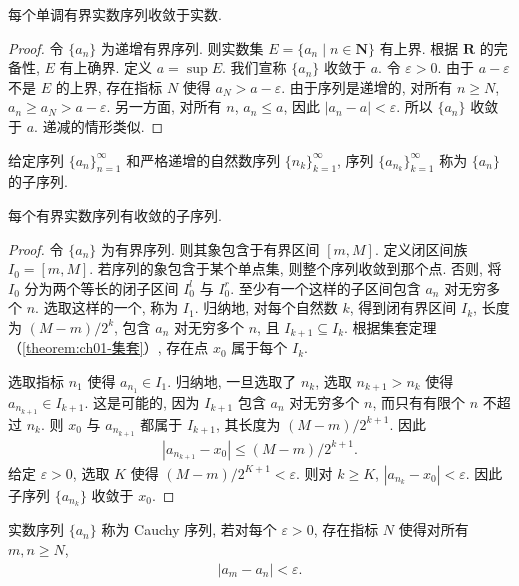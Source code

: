 \documentclass[../../main.tex]{subfiles}
\begin{document}
\begin{theorem}[单调收敛准则]\label{theorem:ch01-单调收敛}
每个单调有界实数序列收敛于实数.
\end{theorem}

\begin{proof}
令 $\{a_{n}\}$ 为递增有界序列. 则实数集 $E=\{a_{n}\mid n\in\mathbf{N}\}$ 有上界. 根据 $\mathbf{R}$ 的完备性, $E$ 有上确界. 定义 $a=\sup E$. 我们宣称 $\{a_{n}\}$ 收敛于 $a$. 令 $\varepsilon>0$. 由于 $a-\varepsilon$ 不是 $E$ 的上界, 存在指标 $N$ 使得 $a_{N}>a-\varepsilon$. 由于序列是递增的, 对所有 $n\geqslant N$, $a_{n}\geqslant a_{N}>a-\varepsilon$. 另一方面, 对所有 $n$, $a_{n}\leqslant a$, 因此 $|a_{n}-a|<\varepsilon$. 所以 $\{a_{n}\}$ 收敛于 $a$. 递减的情形类似.
\end{proof}

给定序列 $\{a_{n}\}_{n=1}^{\infty}$ 和严格递增的自然数序列 $\{n_{k}\}_{k=1}^{\infty}$, 序列 $\{a_{n_{k}}\}_{k=1}^{\infty}$ 称为 $\{a_{n}\}$ 的子序列.

\begin{theorem}\label{theorem:ch01-BW}
每个有界实数序列有收敛的子序列.
\end{theorem}

\begin{proof}
令 $\{a_{n}\}$ 为有界序列. 则其象包含于有界区间 $[m,M]$. 定义闭区间族 $I_{0}=[m,M]$. 若序列的象包含于某个单点集, 则整个序列收敛到那个点. 否则, 将 $I_{0}$ 分为两个等长的闭子区间 $I_{0}^{l}$ 与 $I_{0}^{r}$. 至少有一个这样的子区间包含 $a_{n}$ 对无穷多个 $n$. 选取这样的一个, 称为 $I_{1}$. 归纳地, 对每个自然数 $k$, 得到闭有界区间 $I_{k}$, 长度为 $(M-m)/2^{k}$, 包含 $a_{n}$ 对无穷多个 $n$, 且 $I_{k+1}\subseteq I_{k}$. 根据集套定理（\cref{theorem:ch01-集套}）, 存在点 $x_{0}$ 属于每个 $I_{k}$.

选取指标 $n_{1}$ 使得 $a_{n_{1}}\in I_{1}$. 归纳地, 一旦选取了 $n_{k}$, 选取 $n_{k+1}>n_{k}$ 使得 $a_{n_{k+1}}\in I_{k+1}$. 这是可能的, 因为 $I_{k+1}$ 包含 $a_{n}$ 对无穷多个 $n$, 而只有有限个 $n$ 不超过 $n_{k}$. 则 $x_{0}$ 与 $a_{n_{k+1}}$ 都属于 $I_{k+1}$, 其长度为 $(M-m)/2^{k+1}$. 因此
\begin{align*}
|a_{n_{k+1}}-x_{0}|\leqslant(M-m)/2^{k+1}.
\end{align*}
给定 $\varepsilon>0$, 选取 $K$ 使得 $(M-m)/2^{K+1}<\varepsilon$. 则对 $k\geqslant K$, $|a_{n_{k}}-x_{0}|<\varepsilon$. 因此子序列 $\{a_{n_{k}}\}$ 收敛于 $x_{0}$.
\end{proof}

\begin{definition}[Cauchy 序列]\label{definition:ch01-Cauchy}
实数序列 $\{a_{n}\}$ 称为 Cauchy 序列, 若对每个 $\varepsilon>0$, 存在指标 $N$ 使得对所有 $m,n\geqslant N$,
\begin{align*}
|a_{m}-a_{n}|<\varepsilon.
\end{align*}
\end{definition}
\end{document}
